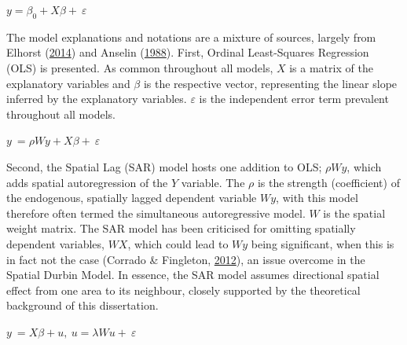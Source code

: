 \documentclass[12pt,twoside]{reedthesis}
\begin{document}
\(y=\beta_0+X\beta+\ \varepsilon\) ~\\
\hspace*{0.333em}

The model explanations and notations are a mixture of sources, largely from Elhorst (\protect\hyperlink{ref-elhorst2014}{2014}) and Anselin (\protect\hyperlink{ref-anselin1988}{1988}). First, Ordinal Least-Squares Regression (OLS) is presented. As common throughout all models, \(X\) is a matrix of the explanatory variables and \(\beta\) is the respective vector, representing the linear slope inferred by the explanatory variables. \(\varepsilon\) is the independent error term prevalent throughout all models.\\
\hspace*{0.333em}

\(y\ =\rho Wy+X\beta+\ \varepsilon\)\\
\hspace*{0.333em}

Second, the Spatial Lag (SAR) model hosts one addition to OLS; \(\rho Wy\), which adds spatial autoregression of the \(Y\) variable. The \(\rho\) is the strength (coefficient) of the endogenous, spatially lagged dependent variable \(Wy\), with this model therefore often termed the simultaneous autoregressive model. \(W\) is the spatial weight matrix. The SAR model has been criticised for omitting spatially dependent variables, \(WX\), which could lead to \(Wy\) being significant, when this is in fact not the case (Corrado \& Fingleton, \protect\hyperlink{ref-corrado2012}{2012}), an issue overcome in the Spatial Durbin Model. In essence, the SAR model assumes directional spatial effect from one area to its neighbour, closely supported by the theoretical background of this dissertation.\\
\hspace*{0.333em}

\(y\ =X\beta+u,\ u=\lambda Wu+\ \varepsilon\)\\
\hspace*{0.333em}
\end{document}
